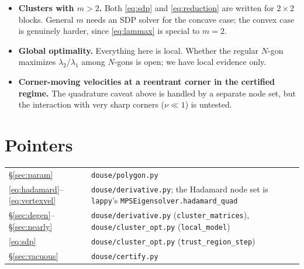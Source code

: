 \documentclass[11pt]{article}
\newcommand{\code}[1]{\texttt{#1}}
\theoremstyle{definition}
\begin{document}
\begin{itemize}
\item \textbf{Clusters with $m>2$.} Both \eqref{eq:sdp} and \eqref{eq:reduction} are written for
  $2\times2$ blocks. General $m$ needs an SDP solver for the concave case; the convex case is
  genuinely harder, since \eqref{eq:lammax} is special to $m=2$.
\item \textbf{Global optimality.} Everything here is local. Whether the regular $N$-gon maximizes
  $\lambda_2/\lambda_1$ among $N$-gons is open; we have local evidence only.
\item \textbf{Corner-moving velocities at a reentrant corner in the certified regime.} The
  quadrature caveat above is handled by a separate node set, but the interaction with very sharp
  corners ($\nu\ll1$) is untested.
\end{itemize}

\section*{Pointers}

\noindent\begin{tabularx}{\textwidth}{@{}lL@{}}
\toprule
\S\ref{sec:param} & \code{douse/polygon.py} \\
\eqref{eq:hadamard}--\eqref{eq:vertexvel} & \code{douse/derivative.py}; the Hadamard node set is
  \code{lappy}'s \code{MPSEigensolver.hadamard\_quad} \\
\S\ref{sec:degen}--\S\ref{sec:nearly} & \code{douse/derivative.py} (\code{cluster\_matrices}),
  \code{douse/cluster\_opt.py} (\code{local\_model}) \\
\eqref{eq:sdp} & \code{douse/cluster\_opt.py} (\code{trust\_region\_step}) \\
\S\ref{sec:vacuous} & \code{douse/certify.py} \\
\bottomrule
\end{tabularx}
\end{document}
